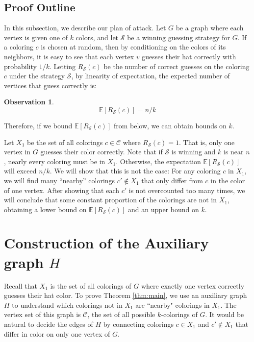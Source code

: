 \documentclass{amsart}
\newcommand{\1}{\mathds{1}}
\newtheorem{obs}[theorem]{Observation}
\numberwithin{theorem}{section}
\def\cS{\ensuremath{\mathcal{S}}}
\begin{document}
\subsection{Proof Outline}
In this subsection, we describe our plan of attack. Let $G$ be a graph where each vertex is given one of $k$ colors, and let $\cS$ be a winning guessing strategy for $G$. If a coloring $c$ is chosen at random, then by conditioning on the colors of its neighbors, it is easy to see that each vertex $v$ guesses their hat correctly with probability $1/k$. Letting $R_\cS(c)$ be the number of correct guesses on the coloring $c$ under the strategy $\cS$, by linearity of expectation, the expected number of vertices that guess correctly is:
\begin{obs}\label{obs:1.2Avg} 
$$\mathbb{E}[R_\cS(c)]=n/k$$
\end{obs} 
Therefore, if we bound $\mathbb{E}[R_\cS(c)]$ from below, we can obtain bounds on $k$.

Let $X_1$ be the set of all colorings $c \in \mathcal{C}$ where $R_\cS(c)=1$. That is, only one vertex in $G$ guesses their color correctly. Note that if $\cS$ is winning and $k$ is near $n$, nearly every coloring must be in $X_1$. Otherwise, the expectation $\mathbb{E}[R_\cS(c)]$ will exceed $n/k$. We will show that this is not the case: For any coloring $c$ in $X_1$, we will find many ``nearby'' colorings $c' \not \in X_1$ that only differ from $c$ in the color of one vertex. After showing that each $c'$ is not overcounted too many times, we will conclude that some constant proportion of the colorings are not in $X_1$, obtaining a lower bound on $\mathbb{E}[R_\cS(c)]$ and an upper bound on $k$. 


\section{Construction of the Auxiliary graph $H$}
Recall that $X_1$ is the set of all colorings of $G$ where exactly one vertex correctly guesses their hat color. To prove Theorem \ref{thm:main}, we use an auxiliary graph $H$ to understand which colorings not in $X_1$ are ``nearby" colorings in $X_1$. The vertex set of this graph is $\mathcal{C}$, the set of all possible $k$-colorings of $G$. It would be natural to decide the edges of $H$ by connecting colorings $c \in X_1$ and $c' \not \in X_1$ that differ in color on only one vertex of $G$. 
\end{document}
